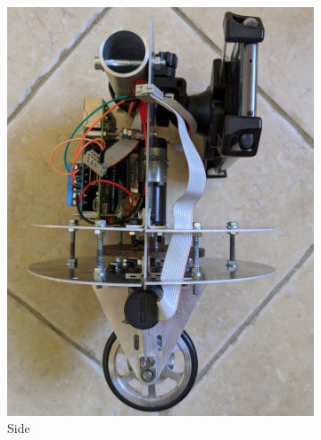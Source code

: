 \documentclass[twoside,twocolumn,12pt]{article}
\begin{document}
\begin{figure}[ht!]
\begin{subfigure}[t]{0.325\textwidth}
    \includegraphics[width=\linewidth]{sidenew}
    \caption{Side}
  \label{sub:sidenew}
  \end{subfigure}
  \begin{subfigure}[t]{0.325\textwidth}

\end{subfigure}
\end{figure}
\end{document}
